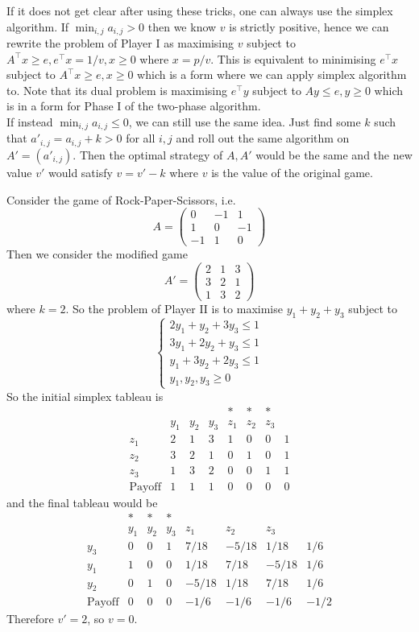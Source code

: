 If it does not get clear after using these tricks, one can always use the simplex algorithm.
If $\min_{i,j}a_{i,j}>0$ then we know $v$ is strictly positive, hence we can rewrite the problem of Player I as maximising $v$ subject to $A^\top x\ge e,e^\top x=1/v,x\ge 0$ where $x=p/v$.
This is equivalent to minimising $e^\top x$ subject to $A^\top x\ge e,x\ge 0$ which is a form where we can apply simplex algorithm to.
Note that its dual problem is maximising $e^\top y$ subject to $Ay\le e,y\ge 0$ which is in a form for Phase I of the two-phase algorithm.\\
If instead $\min_{i,j}a_{i,j}\le 0$, we can still use the same idea.
Just find some $k$ such that $a'_{i,j}=a_{i,j}+k>0$ for all $i,j$ and roll out the same algorithm on $A'=(a'_{i,j})$.
Then the optimal strategy of $A,A'$ would be the same and the new value $v'$ would satisfy $v=v'-k$ where $v$ is the value of the original game.
\begin{example}
    Consider the game of Rock-Paper-Scissors, i.e.
    $$A=\begin{pmatrix}
        0&-1&1\\
        1&0&-1\\
        -1&1&0
    \end{pmatrix}$$
    Then we consider the modified game
    $$A'=\begin{pmatrix}
        2&1&3\\
        3&2&1\\
        1&3&2
    \end{pmatrix}$$
    where $k=2$.
    So the problem of Player II is to maximise $y_1+y_2+y_3$ subject to
    $$\begin{cases}
        2y_1+y_2+3y_3\le 1\\
        3y_1+2y_2+y_3\le 1\\
        y_1+3y_2+2y_3\le 1\\
        y_1,y_2,y_3\ge 0
    \end{cases}$$
    So the initial simplex tableau is
    $$\begin{array}{c|cccccc|c}
        &&&&\ast&\ast&\ast&\\
        &y_1&y_2&y_3&z_1&z_2&z_3&\\ \hline
        z_1&2&1&3&1&0&0&1\\
        z_2&3&2&1&0&1&0&1\\
        z_3&1&3&2&0&0&1&1\\ \hline
        \text{Payoff}&1&1&1&0&0&0&0
    \end{array}$$
    and the final tableau would be
    $$\begin{array}{c|cccccc|c}
        &\ast&\ast&\ast&&&&\\
        &y_1&y_2&y_3&z_1&z_2&z_3&\\ \hline
        y_3&0&0&1&7/18&-5/18&1/18&1/6\\
        y_1&1&0&0&1/18&7/18&-5/18&1/6\\
        y_2&0&1&0&-5/18&1/18&7/18&1/6\\ \hline
        \text{Payoff}&0&0&0&-1/6&-1/6&-1/6&-1/2
    \end{array}$$
    Therefore $v'=2$, so $v=0$.
\end{example}